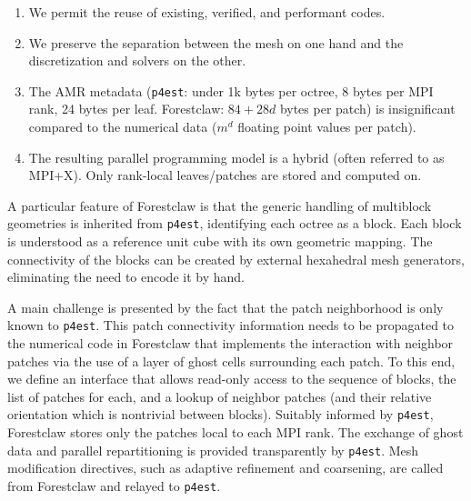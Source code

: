 \documentclass{IOS-Book-Article}     %
\newcommand{\comment}[1]{\textcolor{green}{[DAC: #1]}\xspace}
\newcommand{\clawpack}{{\sc Clawpack}\xspace}
\newcommand{\forestclaw}{Forestclaw\xspace}
\newcommand{\pforest}{\texttt{p4est}\xspace}
\begin{document}
\begin{enumerate}
\item We permit the reuse of existing, verified, and performant codes.
\item We preserve the separation between the mesh on one hand and the
discretization and solvers on the other.
\item The AMR metadata (\pforest:
under 1k bytes per octree, 8 bytes per MPI rank,
24 bytes per leaf. \forestclaw: $84 + 28d$ bytes per patch)
is insignificant compared to
the numerical data ($m^d$ floating point values per patch).
\item The resulting parallel programming model is a hybrid (often referred
to as MPI+X).  Only rank-local leaves/patches are stored and computed on.
\end{enumerate}

A particular feature of \forestclaw is that the generic handling of multiblock
geometries is inherited from \pforest, identifying each octree as a block.
Each block is understood as a reference unit cube with
its own geometric mapping.  The connectivity of the blocks can be created by
external hexahedral mesh generators, eliminating the need to encode it by hand.

A main challenge is presented by the fact that the patch neighborhood
is only known to \pforest.  This patch connectivity information needs
to be propagated to the numerical code in \forestclaw that implements
the interaction with neighbor patches via the use of a layer of ghost
cells surrounding each patch.  To this end, we define an interface
that allows read-only access to the sequence of blocks,
the list of patches for each, and a lookup of neighbor patches (and
their relative orientation which is nontrivial between blocks).
Suitably informed by \pforest, \forestclaw stores only the patches local to
each MPI rank.  The exchange of ghost data and parallel repartitioning is
provided transparently by \pforest.  Mesh modification directives, such as
adaptive refinement and coarsening, are called from \forestclaw and relayed to
\pforest.




\end{document}
